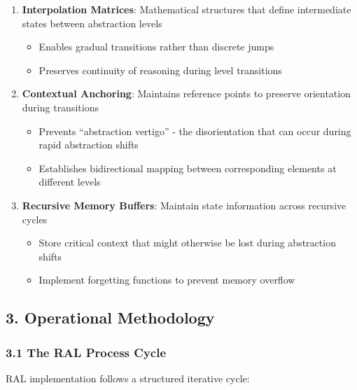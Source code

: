 \documentclass[
]{article}
\providecommand{\tightlist}{%
  \setlength{\itemsep}{0pt}\setlength{\parskip}{0pt}}
\begin{document}
\begin{enumerate}
\def\labelenumi{\arabic{enumi}.}
\tightlist
\item
  \textbf{Interpolation Matrices}: Mathematical structures that define
  intermediate states between abstraction levels

  \begin{itemize}
  \tightlist
  \item
    Enables gradual transitions rather than discrete jumps
  \item
    Preserves continuity of reasoning during level transitions
  \end{itemize}
\item
  \textbf{Contextual Anchoring}: Maintains reference points to preserve
  orientation during transitions

  \begin{itemize}
  \tightlist
  \item
    Prevents ``abstraction vertigo'' - the disorientation that can occur
    during rapid abstraction shifts
  \item
    Establishes bidirectional mapping between corresponding elements at
    different levels
  \end{itemize}
\item
  \textbf{Recursive Memory Buffers}: Maintain state information across
  recursive cycles

  \begin{itemize}
  \tightlist
  \item
    Store critical context that might otherwise be lost during
    abstraction shifts
  \item
    Implement forgetting functions to prevent memory overflow
  \end{itemize}
\end{enumerate}

\subsection{3. Operational Methodology}\label{operational-methodology}

\subsubsection{3.1 The RAL Process Cycle}\label{the-ral-process-cycle}

RAL implementation follows a structured iterative cycle:
\end{document}
